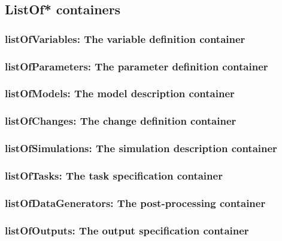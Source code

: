 \newpage
\subsection{ListOf* containers}


  \subsubsection{listOfVariables: The variable definition container}
  

  \subsubsection{listOfParameters: The parameter definition container}
  

  \subsubsection{listOfModels: The model description container}
  

  \subsubsection{listOfChanges: The change definition container}
  

  \subsubsection{listOfSimulations: The simulation description container}
  

  \subsubsection{listOfTasks: The task specification container}
  

 \subsubsection{listOfDataGenerators: The post-processing container}
 

 \subsubsection{listOfOutputs: The output specification container}
 


